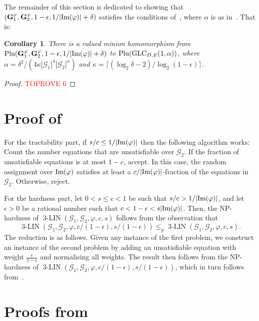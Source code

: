 \documentclass[a4paper,11pt]{article}
\newtheorem{corollary}[theorem]{Corollary}
\theoremstyle{definition}
\newcommand{\gr}{\mathscr{G}}
\newcommand{\glc}{\mathrm{GLC}}
\newcommand{\im}{\textnormal{Im}}
\newcommand{\eq}{\ensuremath{\operatorname{3-LIN}}}
\newcommand{\plu}{\textnormal{Plu}}
\begin{document}
The remainder of this section is dedicated to showing that $(\mathbf{G}^\varphi_1,\mathbf{G}^\varphi_2,1-\epsilon,1/|\im(\varphi)|+\delta)$ 
satisfies the conditions of~, where $\alpha$ is as in~. That is:

\begin{corollary}
    There is a valued minion homomorphism from $\plu(\mathbf{G}^\varphi_1,\mathbf{G}^\varphi_2,1-\epsilon,1/|\im(\varphi)|+\delta)$ to $\plu(\glc_{D,E}(1,\alpha))$, where $\alpha=\delta^2/(4\kappa |\gr_1|^4 |\gr_2|^\kappa)$ and $\kappa= \lceil(\log_2 \delta - 2)/\log_2(1-\epsilon)\rceil$.
\end{corollary}

\begin{proof}\textcolor{red}{TOPROVE 6}\end{proof}


\appendix

\section{Proof of~}
\label{ap:non-cubic}

\THnoncubic*

For the tractability part, if $s/c \leq 1/|\im(\varphi)|$ then the
following algorithm works: Count the number equations that are unsatisfiable
over $\gr_2$. If the fraction of unsatisfiable equations is at most $1-c$,
accept. In this case, the random assignment over $\im(\varphi)$ satisfies at
least a $c/|\im(\varphi)|$-fraction of the equations in $\gr_2$. Otherwise, reject. \par

For the hardness part, let  $0<s\leq c <1$ be such that
$s/c > 1/|\im(\varphi)|$, and let $\epsilon >0$ be a rational number such that $c <
1-\epsilon < s|\im(\varphi)|$. Then, the NP-hardness of $\eq(\gr_1,\gr_2, \varphi, c, s)$ follows from the observation that 
\[
\eq(\gr_1,\gr_2, \varphi, c/(1-\epsilon), s/(1-\epsilon)) \leq_p
\eq(\gr_1,\gr_2, \varphi, c, s).
\]
The reduction is as follows. Given any instance of the first problem, we
construct an instance of the second problem by adding an unsatisfiable equation
with weight $\frac{\epsilon}{1-\epsilon}$ and normalising
all weights. The
result then follows from the NP-hardness of $\eq(\gr_1,\gr_2, \varphi,
c/(1-\epsilon), s/(1-\epsilon))$, which in turn follows from~.

\section{Proofs from~} \label{ap:fourier-proofs}
\end{document}
